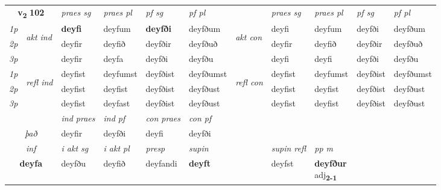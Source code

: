 \noindent
\begin{tabular}{lllllllllll} \toprule
\multicolumn{2}{c}{\textbf{v{\textsubscript{2}}} \Large{\textbf{102}}}  &  \textit{praes sg}  & \textit{praes pl}  &\textit{ pf sg} & \textit{pf pl} &  &  \textit{praes sg}  & \textit{praes pl}  & \textit{pf sg} & \textit{pf pl } \\*
	\cmidrule{3-6} \cmidrule{8-11}
 {\textit{1p}} & \multirow{3}{*}{\begin{turn}{90}\textit{akt ind}\end{turn}} & \textbf{deyfi} & deyfum & \textbf{deyfði} & deyfðum & \multirow{3}{*}{\begin{turn}{90}\textit{akt con}\end{turn}} &deyfi & deyfum & deyfði & deyfðum\\*
 {\textit{2p}} &  &  deyfir  & deyfið & deyfðir & deyfðuð & & deyfir & deyfið & deyfðir & deyfðuð \\*
{\textit{3p}} &  & deyfir & deyfa & deyfði & deyfðu & & deyfi & deyfi& deyfði & deyfðu \\*
\cmidrule{3-6} \cmidrule{8-11}
 {\textit{1p}} & \multirow{3}{*}{\begin{turn}{90}\textit{refl ind}\end{turn}}  & deyfist & deyfumst & deyfðist & deyfðumst & \multirow{3}{*}{\begin{turn}{90}\textit{refl con}\end{turn}}  &deyfist & deyfumst & deyfðist & deyfðumst \\*
 {\textit{2p}} &  & deyfist & deyfist & deyfðist & deyfðust & &deyfist & deyfist & deyfðist & deyfðust \\*
 {\textit{3p}}  & & deyfist & deyfast & deyfðist & deyfðust & & deyfist & deyfist& deyfðist & deyfðust \\*
\cmidrule{3-6} \cmidrule{8-11}

   & &  \textit{ind praes} & \textit{ind pf} & \textit{con praes} & \textit{con pf} \\*
\multicolumn{2}{c}{ \textit{það} } & deyfir & deyfði & deyfi & deyfði \\*

\cmidrule{3-9}
   \multicolumn{2}{c}{\textit{inf}}  & \textit{i akt sg} & \textit{i akt pl}   & \textit{presp} & \textit{supin} && \textit{supin refl} & \textit{pp m} \\*
  \multicolumn{2}{c}{\textbf{deyfa}} & deyfðu  & deyfið   & deyfandi &  \textbf{deyft} && deyfst & \specialcell{\textbf{deyfður} \\ adj\textbf{\textsubscript{2-1}}} \\*
\end{tabular}

